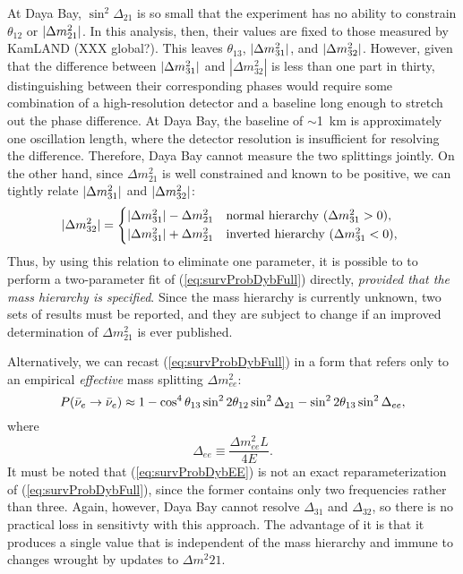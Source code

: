 \documentclass[../thesis.tex]{subfiles}
\begin{document}
At Daya Bay, $\sin^2 \Delta_{21}$ is so small that the experiment has no ability to constrain $\theta_{12}$ or $\lvert \Delta m^2_{21}\rvert$. In this analysis, then, their values are fixed to those measured by KamLAND (XXX global?). This leaves $\theta_{13}$, $\lvert \Delta m^2_{31}\rvert$, and $\lvert \Delta m^2_{32}\rvert$. However, given that the difference between $\lvert \Delta m^2_{31}\rvert$ and $|\Delta m^2_{32}|$ is less than one part in thirty, distinguishing between their corresponding phases would require some combination of a high-resolution detector and a baseline long enough to stretch out the phase difference. At Daya Bay, the baseline of $\sim$1~km is approximately one oscillation length, where the detector resolution is insufficient for resolving the difference. Therefore, Daya Bay cannot measure the two splittings jointly. On the other hand, since $\Delta m^2_{21}$ is well constrained and known to be positive, we can tightly relate $\lvert \Delta m^2_{31}\rvert$ and $\lvert \Delta m^2_{32}\rvert$:
\[ \abs{\Delta m^2_{32}} =
  \begin{cases*}
    \abs{\Delta m^2_{31}} - \Delta m^2_{21} & normal hierarchy ($\Delta m^2_{31} > 0$), \\
    \abs{\Delta m^2_{31}} + \Delta m^2_{21} & inverted hierarchy ($\Delta m^2_{31} < 0$), \\
  \end{cases*}
\]
Thus, by using this relation to eliminate one parameter, it is possible to to perform a two-parameter fit of (\ref{eq:survProbDybFull}) directly, \emph{provided that the mass hierarchy is specified}. Since the mass hierarchy is currently unknown, two sets of results must be reported, and they are subject to change if an improved determination of $\Delta m^2_{21}$ is ever published.

Alternatively, we can recast (\ref{eq:survProbDybFull}) in a form that refers only to an empirical \emph{effective} mass splitting $\Delta m^2_{ee}$:
\begin{equation}
  \label{eq:survProbDybEE}
  P(\bar\nu_e \rightarrow \bar\nu_e) \approx 1 - \cos^4\theta_{13}\sin^2 2\theta_{12} \sin^2 \Delta_{21}
  - \sin^2 2\theta_{13}\sin^2\Delta_{ee},
\end{equation}
where
\[ \Delta_{ee} \equiv \frac{\Delta m^2_{ee}L}{4E}. \]
It must be noted that (\ref{eq:survProbDybEE}) is not an exact reparameterization of (\ref{eq:survProbDybFull}), since the former contains only two frequencies rather than three. Again, however, Daya Bay cannot resolve $\Delta_{31}$ and $\Delta_{32}$, so there is no practical loss in sensitivty with this approach. The advantage of it is that it produces a single value that is independent of the mass hierarchy and immune to changes wrought by updates to $\Delta m^2{21}$.
\end{document}

